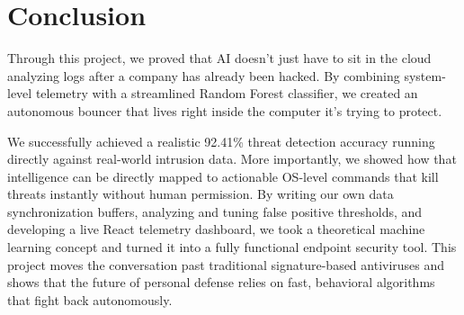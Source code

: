 \documentclass[conference]{IEEEtran}
\begin{document}
\section{Conclusion}

Through this project, we proved that AI doesn't just have to sit in the cloud analyzing logs after a company has already been hacked. By combining system-level telemetry with a streamlined Random Forest classifier, we created an autonomous bouncer that lives right inside the computer it's trying to protect. 

We successfully achieved a realistic 92.41\% threat detection accuracy running directly against real-world intrusion data. More importantly, we showed how that intelligence can be directly mapped to actionable OS-level commands that kill threats instantly without human permission. By writing our own data synchronization buffers, analyzing and tuning false positive thresholds, and developing a live React telemetry dashboard, we took a theoretical machine learning concept and turned it into a fully functional endpoint security tool. This project moves the conversation past traditional signature-based antiviruses and shows that the future of personal defense relies on fast, behavioral algorithms that fight back autonomously.
\end{document}
